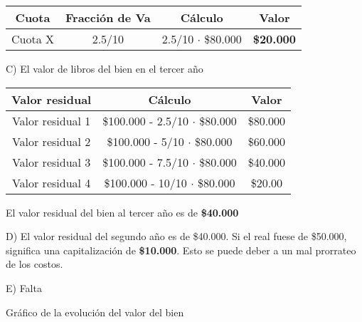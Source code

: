 \documentclass[12pt,a4paper]{article}
\begin{document}
        \begin{table}[H]
        \centering
        	\begin{tabular}{ | c | c | c | c | }
            	\hline
                Cuota	&	Fracción de Va	&	Cálculo					&	Valor		\\ \hline
                Cuota X	&	2.5/10			&	2.5/10 $\cdot$ \$80.000	&	\textbf{\$20.000}	\\ \hline
			\end{tabular}
		\end{table}
        
        C) El valor de libros del bien en el tercer año
        
        \begin{table}[H]
        \centering
        	\begin{tabular}{ | c | c | c | }
            	\hline
                Valor residual		&	Cálculo								&	Valor		\\ \hline
                Valor residual 1	&	\$100.000 - 2.5/10 $\cdot$ \$80.000	&	\$80.000	\\ \hline
                Valor residual 2	&	\$100.000 - 5/10 $\cdot$ \$80.000	&	\$60.000	\\ \hline
                Valor residual 3	&	\$100.000 - 7.5/10 $\cdot$ \$80.000	&	\$40.000	\\ \hline
                Valor residual 4	&	\$100.000 - 10/10 $\cdot$ \$80.000	&	\$20.00		\\ \hline
			\end{tabular}
		\end{table}
        
        \par{
        	El valor residual del bien al tercer año es de \textbf{\$40.000}
            }
		
        \newpage
        
        D) El valor residual del segundo año es de \$40.000. Si el real fuese de \$50.000, significa una capitalización de \textbf{\$10.000}. Esto se puede deber a un mal prorrateo de los costos.
        
        \hrulefill
        
        E) Falta
        
        \hrulefill
        
        \par{
        	Gráfico de la evolución del valor del bien
            }
		
\end{document}
